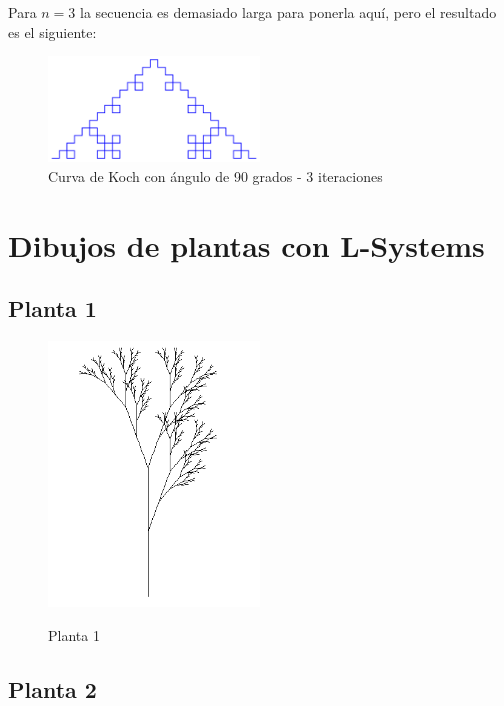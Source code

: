 \noindent Para $n=3$ la secuencia es demasiado larga para ponerla aquí, pero el resultado es el siguiente:

\begin{figure}[H]
    \centering
    \includegraphics[width=0.5\textwidth]{figures/l-system-kock-snowflake-4.png}
    \caption{Curva de Koch con ángulo de 90 grados - 3 iteraciones}
    \label{fig:koch-snowflake-4}
\end{figure}

\section{Dibujos de plantas con L-Systems}

\subsection{Planta 1}

\begin{figure}[H]
    \centering
    \includegraphics[width=0.5\textwidth]{figures/l-system-plant-1.png}
    \caption{Planta 1}
    \label{fig:plant-1}
    \cite{web-2023}
\end{figure}

\subsection{Planta 2}


